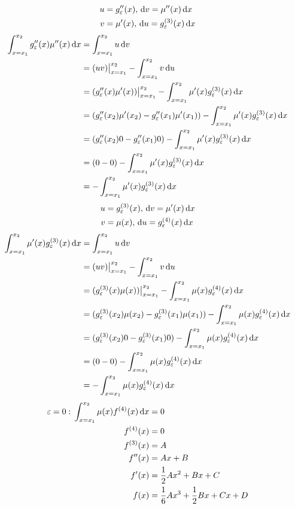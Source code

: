 \documentclass{article}
\begin{document}
\begin{align*}
  u &= g_\varepsilon''(x), \, \mathrm{d}v = \mu''(x) \, \mathrm{d}x \\
  v &= \mu'(x), \, \mathrm{d}u = g_\varepsilon^{(3)}(x) \, \mathrm{d}x
\end{align*}
\begin{align*}
  \int_{x=x_1}^{x_2} g_\varepsilon''(x)\mu''(x) \, \mathrm{d}x
  &= \int_{x=x_1}^{x_2}u\, \mathrm{d}v \\
  &= (uv)\big|_{x=x_1}^{x_2} - \int_{x=x_1}^{x_2} v \, \mathrm{d}u \\
  &= (g_\varepsilon''(x)\mu'(x))\big|_{x=x_1}^{x_2} - \int_{x=x_1}^{x_2} \mu'(x)g_\varepsilon^{(3)}(x) \, \mathrm{d}x \\
  &= (g_\varepsilon''(x_2)\mu'(x_2)-g_\varepsilon''(x_1)\mu'(x_1)) - \int_{x=x_1}^{x_2} \mu'(x)g_\varepsilon^{(3)}(x) \, \mathrm{d}x \\
  &= (g_\varepsilon''(x_2)0-g_\varepsilon''(x_1)0) - \int_{x=x_1}^{x_2} \mu'(x)g_\varepsilon^{(3)}(x) \, \mathrm{d}x \\
  &= (0-0) - \int_{x=x_1}^{x_2} \mu'(x)g_\varepsilon^{(3)}(x) \, \mathrm{d}x \\
  &= -\int_{x=x_1}^{x_2} \mu'(x)g_\varepsilon^{(3)}(x) \, \mathrm{d}x
\end{align*}
\begin{align*}
  u &= g_\varepsilon^{(3)}(x), \, \mathrm{d}v = \mu'(x) \, \mathrm{d}x \\
  v &= \mu(x), \, \mathrm{d}u = g_\varepsilon^{(4)}(x) \, \mathrm{d}x
\end{align*}
\begin{align*}
  \int_{x=x_1}^{x_2} \mu'(x)g_\varepsilon^{(3)}(x) \, \mathrm{d}x
  &= \int_{x=x_1}^{x_2}u\, \mathrm{d}v \\
  &= (uv)\big|_{x=x_1}^{x_2} - \int_{x=x_1}^{x_2} v \, \mathrm{d}u \\
  &= (g_\varepsilon^{(3)}(x)\mu(x))\big|_{x=x_1}^{x_2} - \int_{x=x_1}^{x_2} \mu(x) g_\varepsilon^{(4)}(x) \, \mathrm{d}x \\
  &= (g_\varepsilon^{(3)}(x_2)\mu(x_2)-g_\varepsilon^{(3)}(x_1)\mu(x_1)) - \int_{x=x_1}^{x_2} \mu(x) g_\varepsilon^{(4)}(x) \, \mathrm{d}x \\
  &= (g_\varepsilon^{(3)}(x_2)0-g_\varepsilon^{(3)}(x_1)0) - \int_{x=x_1}^{x_2} \mu(x) g_\varepsilon^{(4)}(x) \, \mathrm{d}x \\
  &= (0-0) - \int_{x=x_1}^{x_2} \mu(x) g_\varepsilon^{(4)}(x) \, \mathrm{d}x \\
  &= -\int_{x=x_1}^{x_2} \mu(x) g_\varepsilon^{(4)}(x) \, \mathrm{d}x
\end{align*}
\begin{align*}
  \varepsilon = 0:\, \int_{x=x_1}^{x_2} \mu(x) f^{(4)}(x) \, \mathrm{d}x &= 0 \\
  f^{(4)}(x) &= 0 \\
  f^{(3)}(x) &= A \\
  f''(x) &= Ax+B \\
  f'(x) &= \frac{1}{2}Ax^2+Bx+C \\
  f(x) &= \frac{1}{6}Ax^3+\frac{1}{2}Bx+Cx+D \\
\end{align*}
\end{document}
